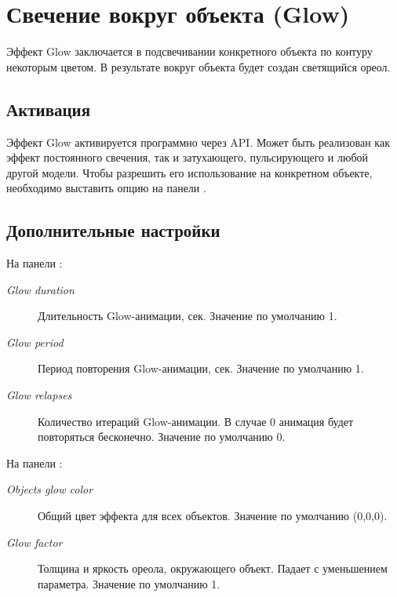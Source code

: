 \documentclass[a4paper,12pt,oneside]{sphinxmanual}
\begin{document}
\begin{DUlineblock}{0em}
\item[] 
\end{DUlineblock}


\section{Свечение вокруг объекта (Glow)}
\label{postprocessing_effects:id26}\label{postprocessing_effects:index-7}\label{postprocessing_effects:glow}
Эффект Glow заключается в подсвечивании конкретного объекта по контуру некоторым цветом. В результате вокруг объекта будет создан светящийся ореол.


\subsection{Активация}
\label{postprocessing_effects:id27}
Эффект Glow активируется программно через API. Может быть реализован как эффект постоянного свечения, так и затухающего, пульсирующего и любой другой модели. Чтобы разрешить его использование на конкретном объекте, необходимо выставить опцию  на панели .


\subsection{Дополнительные настройки}
\label{postprocessing_effects:id28}
На панели :
\begin{description}
\item[{\emph{Glow duration}}] \leavevmode
Длительность Glow-анимации, сек. Значение по умолчанию 1.

\item[{\emph{Glow period}}] \leavevmode
Период повторения Glow-анимации, сек. Значение по умолчанию 1.

\item[{\emph{Glow relapses}}] \leavevmode
Количество итераций Glow-анимации. В случае 0 анимация будет повторяться бесконечно. Значение по умолчанию 0.

\end{description}

На панели :
\begin{description}
\item[{\emph{Objects glow color}}] \leavevmode
Общий цвет эффекта для всех объектов. Значение по умолчанию (0,0,0).

\item[{\emph{Glow factor}}] \leavevmode
Толщина и яркость ореола, окружающего объект. Падает с уменьшением параметра. Значение по умолчанию 1.

\end{description}
\end{document}
